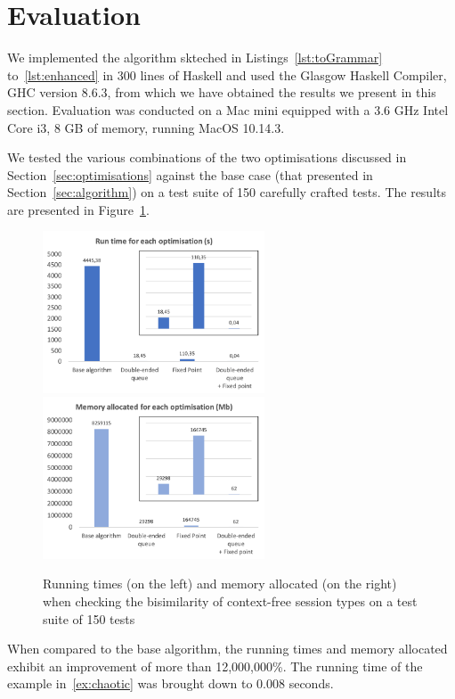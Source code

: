 \section{Evaluation}
\label{sec:evaluation}


We implemented the algorithm skteched in Listings~\ref{lst:toGrammar}
to~\ref{lst:enhanced} in 300 lines of Haskell and used the Glasgow
Haskell Compiler, GHC version 8.6.3, from which we have obtained the
results we present in this section.  Evaluation was conducted on a Mac
mini equipped with a 3.6 GHz Intel Core i3, 8 GB of memory, running
MacOS 10.14.3.

We tested the various combinations of the two optimisations discussed
in Section~\ref{sec:optimisations} against the base case (that
presented in Section~\ref{sec:algorithm}) on a test suite of 150
carefully crafted tests. The results are presented in
Figure~\ref{fig:results}.

\begin{figure}[h]
  \includegraphics[height=4.8cm]{img/run_time}
  \quad 
  \includegraphics[height=4.8cm]{img/memory_alloc}	
  \caption{Running times (on the left) and memory allocated (on the
    right) when checking the bisimilarity of context-free session
    types on a test suite of 150 tests}
  \label{fig:results}
\end{figure}

When compared to the base algorithm, the running times and memory
allocated exhibit an improvement of more than 12,000,000\%. The
running time of the example in~\eqref{ex:chaotic} was brought down to
0.008 seconds.%



